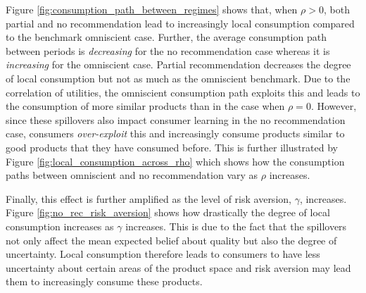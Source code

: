 \documentclass[sigconf]{acmart}
\begin{document}
Figure \ref{fig:consumption_path_between_regimes} shows that, when $\rho > 0$, both partial and no recommendation lead to increasingly local consumption compared to the benchmark omniscient case. Further, the average consumption path between periods is \textit{decreasing} for the no recommendation case whereas it is \textit{increasing} for the omniscient case. Partial recommendation decreases the degree of local consumption but not as much as the omniscient benchmark. Due to the correlation of utilities, the omniscient consumption path exploits this and leads to the consumption of more similar products than in the case when $\rho = 0$. However, since these spillovers also impact consumer learning in the no recommendation case, consumers \textit{over-exploit} this and increasingly consume products similar to good products that they have consumed before. This is further illustrated by Figure \ref{fig:local_consumption_across_rho} which shows how the consumption paths between omniscient and no recommendation vary as $\rho$ increases.

Finally, this effect is further amplified as the level of risk aversion, $\gamma$, increases. Figure \ref{fig:no_rec_risk_aversion} shows how drastically the degree of local consumption increases as $\gamma$ increases. This is due to the fact that the spillovers not only affect the mean expected belief about quality but also the degree of uncertainty. Local consumption therefore leads to consumers to have less uncertainty about certain areas of the product space and risk aversion may lead them to increasingly consume these products.
\end{document}
